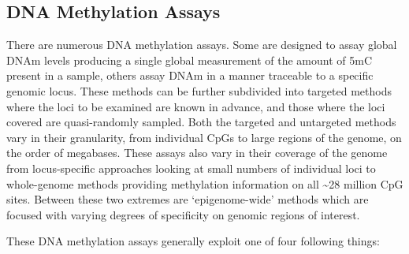 \documentclass[
]{book}
\begin{document}
\hypertarget{dna-methylation-assays}{%
\subsection{DNA Methylation Assays}\label{dna-methylation-assays}}

There are numerous DNA methylation assays.
Some are designed to assay global DNAm levels producing a single global measurement of the amount of 5mC present in a sample, others assay DNAm in a manner traceable to a specific genomic locus.
These methods can be further subdivided into targeted methods where the loci to be examined are known in advance, and those where the loci covered are quasi-randomly sampled.
Both the targeted and untargeted methods vary in their granularity, from individual CpGs to large regions of the genome, on the order of megabases.
These assays also vary in their coverage of the genome from locus-specific approaches looking at small numbers of individual loci to whole-genome methods providing methylation information on all \textasciitilde28 million CpG sites.
Between these two extremes are `epigenome-wide' methods which are focused with varying degrees of specificity on genomic regions of interest.

These DNA methylation assays generally exploit one of four following things:
\end{document}
